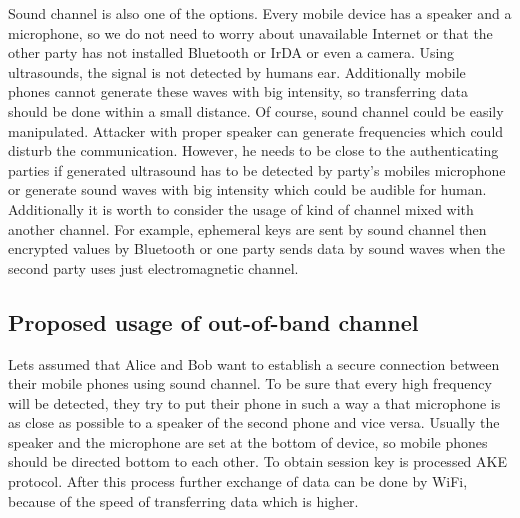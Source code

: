 \documentclass[11pt,titlepage]{article}
\theoremstyle{plain}
\begin{document}
\vspace{5mm}

Sound channel is also one of the options. Every mobile device has a speaker and a microphone, so we do not need to worry about unavailable Internet or that the other party has not installed Bluetooth or IrDA or even a camera. Using ultrasounds, the signal is not detected by humans ear. Additionally mobile phones cannot generate these waves with big intensity, so transferring data should be done within a small distance. Of course, sound channel could be easily manipulated. Attacker with proper speaker can generate frequencies which could disturb the communication. However, he needs to be close to the authenticating parties if generated ultrasound has to be detected by party's mobiles microphone or generate sound waves with big intensity which could be audible for human. Additionally it is worth to consider the usage of kind of channel mixed with another channel. For example, ephemeral keys are sent by sound channel then encrypted values by Bluetooth or one party sends data by sound waves when the second party uses just electromagnetic channel.

\subsection{Proposed usage of out-of-band channel}

Lets assumed that Alice and Bob want to establish a secure connection between their mobile phones using sound channel. To be sure that every high frequency will be detected, they try to put their phone in such a way a that microphone is as close as possible to a speaker of the second phone and vice versa. Usually the speaker and the microphone are set at the bottom of device, so mobile phones should be directed bottom to each other. To obtain session key is processed AKE protocol. After this process further exchange of data can be done by WiFi, because of the speed of transferring data which is higher. 
\end{document}
